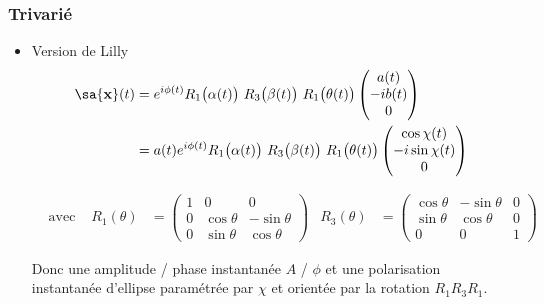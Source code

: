\subsubsection{Trivarié}

\begin{itemize}
	\item Version de Lilly \cite{lilly_modulated_2011}
	\begin{equation}
		\begin{aligned}
			\sa{\bf{x}}(t) &= e^{i\phi(t)} R_1\big(\alpha(t)\big)\ R_3\big(\beta(t)\big)\ R_1\big(\theta(t)\big)\begin{pmatrix}
				a(t) \\ -ib(t) \\ 0
			\end{pmatrix} \\
			&= a(t)e^{i\phi(t)} R_1\big(\alpha(t)\big)\ R_3\big(\beta(t)\big)\ R_1\big(\theta(t)\big)\begin{pmatrix}
				\cos\chi(t) \\ -i\sin\chi(t) \\ 0
			\end{pmatrix}
		\end{aligned}
	\end{equation}
	
	\begin{align*}
		&\text{avec : }  &  
		R_1(\theta) &= \begin{pmatrix}
			1 & 0 & 0 \\ 0 & \cos\theta & -\sin\theta \\ 0 & \sin\theta & \cos\theta
		\end{pmatrix}  &  
		R_3(\theta) &= \begin{pmatrix}
			\cos\theta & -\sin\theta & 0 \\ \sin\theta & \cos\theta & 0 \\ 0 & 0 & 1 
		\end{pmatrix}
	\end{align*}
	
	Donc une amplitude / phase instantanée $A$ / $\phi$ et une polarisation instantanée d'ellipse paramétrée par $\chi$ et orientée par la rotation $R_1R_3R_1$.
	

\end{itemize}
